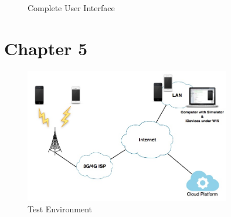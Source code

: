\begin{figure}[htbp]
	\centering
	 \qquad
	\caption{Complete User Interface}
	\label{fig:user_interface}
\end{figure}


\section{Chapter 5}

\begin{figure}[ht]
\centering
\includegraphics[width=0.8\textwidth]{./Images/test_env}
\caption{Test Environment}
\label{fig:test_env}
\end{figure}

